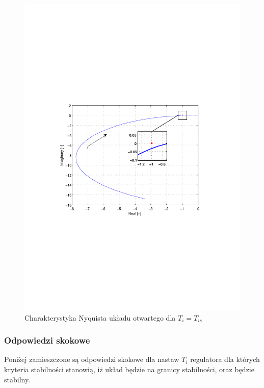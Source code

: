 \documentclass[12pt]{article}
\begin{document}
\begin{figure}[!htb]
	\begin{center}
		\includegraphics[trim=5cm 9cm 5cm 9cm]{../res/img/2-10-0,5_nyq.pdf} 
	\end{center}
	\caption{Charakterystyka Nyquista układu otwartego dla $T_{i}=T_{is}$}
\end{figure}

\newpage

\subsubsection{Odpowiedzi skokowe}

Poniżej zamieszczone są odpowiedzi skokowe dla nastaw $T_i$ regulatora dla
których kryteria stabilności stanowią, iż układ będzie na granicy stabilności, oraz
będzie stabilny.
\end{document}
